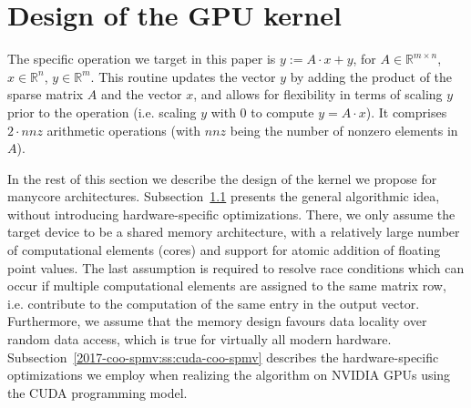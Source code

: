 \section{Design of the \coo \spmv GPU kernel}
\label{2017-coo-spmv:s3-kernel}


The specific \spmv operation we target in this paper is $y := A\cdot x + y$, 
for $A\in\mathbb{R}^{m\times n}$, $x\in\mathbb{R}^n$, $y\in\mathbb{R}^m$.
This routine updates the vector $y$
by adding the product of the sparse matrix $A$ and the vector $x$,
and allows for flexibility in terms of scaling $y$ prior to the
operation (i.e. scaling $y$ with 0 to compute $y=A\cdot x$).
It comprises $2\cdot nnz$ arithmetic operations (with $nnz$ being the number of nonzero elements in $A$).

In the rest of this section we describe the design of the \coo \spmv kernel we 
propose for manycore architectures.
Subsection~\ref{2017-coo-spmv:ss:coo-spmv} presents the general algorithmic idea, without
introducing hardware-specific optimizations.
There, we only assume the target device to be a shared memory 
architecture, with a relatively large number of
computational elements (cores) and support for atomic addition of floating
point values.
The last assumption is required to resolve race conditions which can occur if 
multiple computational elements are assigned to the same matrix row, i.e. 
contribute 
to the computation of the same entry in the output vector.
Furthermore, we assume that the memory design favours data locality over
random data access, which is true for virtually all modern hardware.
Subsection~\ref{2017-coo-spmv:ss:cuda-coo-spmv} describes the hardware-specific optimizations 
we employ when realizing the \coo \spmv algorithm on NVIDIA GPUs using 
the CUDA programming model.

\subsection{\coo \spmv}
\label{2017-coo-spmv:ss:coo-spmv}


